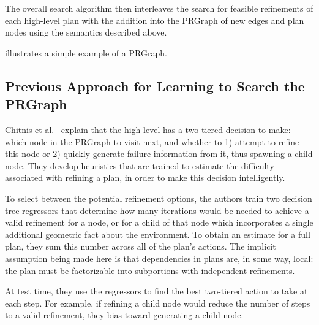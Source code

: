 The overall search algorithm then interleaves the search for feasible
refinements of each high-level plan with the addition into the
PRGraph of new edges and plan nodes using the semantics described above.

 illustrates a simple example of a PRGraph.

\subsection{Previous Approach for Learning to Search the PRGraph}
Chitnis et al.~\cite{chitnis2015mlpc} explain that the high level has a two-tiered
decision to make: which node in the PRGraph to
visit next, and whether to 1) attempt to refine this node or 2) quickly generate failure information
from it, thus spawning a child node. They develop heuristics that are trained to estimate
the difficulty associated with refining a plan, in order to make this decision intelligently.

To select between the potential refinement options, the authors train two decision tree regressors
that determine how many iterations would be needed to achieve a valid refinement for a node, or for a child
of that node which incorporates a single additional geometric fact about the environment.
To obtain an estimate for a full plan, they sum this number across all of the plan's actions.
The implicit assumption being made here is that dependencies in plans are, in some way, local:
the plan must be factorizable into subportions with independent refinements.

At test time, they use the regressors to find the best two-tiered action to take at each step.
For example, if refining a child node would reduce the number of steps to a valid refinement,
they bias toward generating a child node.